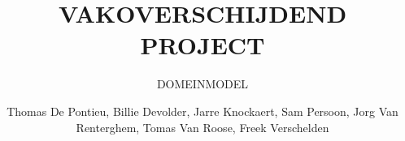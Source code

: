 \documentclass[a4paper, twoside, 12pt]{ugent_report}
\begin{document}
\title{VAKOVERSCHIJDEND PROJECT}
\subtitle{DOMEINMODEL\\}
\author{Thomas De Pontieu, Billie Devolder, Jarre Knockaert, Sam Persoon, Jorg Van Renterghem, Tomas Van Roose, Freek Verschelden}
\maketitle

\restoregeometry
\newpage\null\thispagestyle{empty}\newpage
\end{document}
